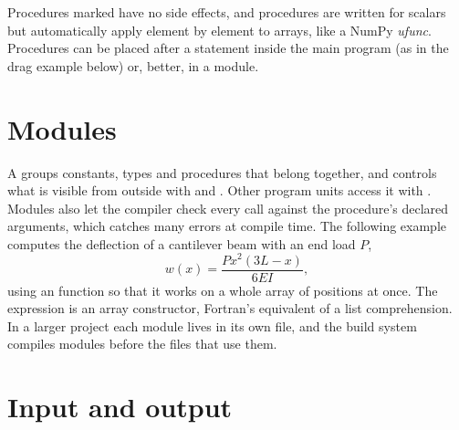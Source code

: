Procedures marked  have no side effects, and  procedures are
written for scalars but automatically apply element by element to arrays, like a NumPy
\emph{ufunc}. Procedures can be placed after a  statement inside the main
program (as in the drag example below) or, better, in a module.

\section{Modules}

A  groups constants, types and procedures that belong together, and controls
what is visible from outside with  and . Other program units
access it with . Modules also let the compiler check every call against the
procedure's declared arguments, which catches many errors at compile time. The following
example computes the deflection of a cantilever beam with an end load $P$,
\[
w(x) = \frac{P x^2 (3L - x)}{6EI},
\]
using an  function so that it works on a whole array of positions at once.
The expression \code{[(L * k / 4.0\_dp, k = 0, 4)]} is an  array
constructor, Fortran's equivalent of a list comprehension. In a larger project each module
lives in its own file, and the build system compiles modules before the files that use
them.

\section{Input and output}

